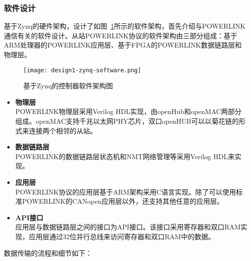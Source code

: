 \subsubsection{软件设计}

基于Zynq的硬件架构，设计了如图~\ref{fig:design1-zynq-software}所示的软件架构，首先介绍与POWERLINK通信有关的软件设计。从站POWERLINK协议的软件架构由三部分组成：基于ARM处理器的POWERLINK应用层、基于FPGA的POWERLINK数据链路层和物理层。

\begin{figure}[!htb]
  \centering
  \texttt{[image: design1-zynq-software.png]}
  \caption{基于Zynq的控制器软件架构图}
  \label{fig:design1-zynq-software}
\end{figure}

\begin{itemize}

\item \textbf{物理层} \\ 
POWERLINK物理层采用Verilog HDL实现，由openHub和openMAC两部分组成。openMAC支持千兆以太网PHY芯片，双口openHUB可以以菊花链的形式来连接两个相邻的从站。 

\item \textbf{数据链路层} \\ 
POWERLINK的数据链路层状态机和NMT网络管理等采用Verilog HDL来实现。

\item \textbf{应用层} \\ 
POWERLINK协议的应用层基于ARM架构采用C语言实现。除了可以使用标准POWERLINK的CANopen应用层以外，还支持其他任意的应用层。

\item \textbf{API接口} \\ 
应用层与数据链路层之间的接口为API接口。该接口采用寄存器和双口RAM实现，应用层通过32位并行总线来访问寄存器和双口RAM中的数据。

\end{itemize}

数据传输的流程和细节如下：

